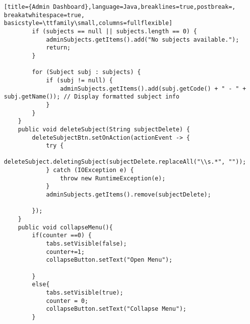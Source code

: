 \begin{lstlisting}[title={Admin Dashboard},language=Java,breaklines=true,postbreak=, breakatwhitespace=true, basicstyle=\ttfamily\small,columns=fullflexible]
        if (subjects == null || subjects.length == 0) {
            adminSubjects.getItems().add("No subjects available.");
            return;
        }

        for (Subject subj : subjects) {
            if (subj != null) {
                adminSubjects.getItems().add(subj.getCode() + " - " + subj.getName()); // Display formatted subject info
            }
        }
    }
    public void deleteSubject(String subjectDelete) {
        deleteSubjectBtn.setOnAction(actionEvent -> {
            try {
                deleteSubject.deletingSubject(subjectDelete.replaceAll("\\s.*", ""));
            } catch (IOException e) {
                throw new RuntimeException(e);
            }
            adminSubjects.getItems().remove(subjectDelete);

        });
    }
    public void collapseMenu(){
        if(counter ==0) {
            tabs.setVisible(false);
            counter+=1;
            collapseButton.setText("Open Menu");

        }
        else{
            tabs.setVisible(true);
            counter = 0;
            collapseButton.setText("Collapse Menu");
        }


\end{lstlisting}
